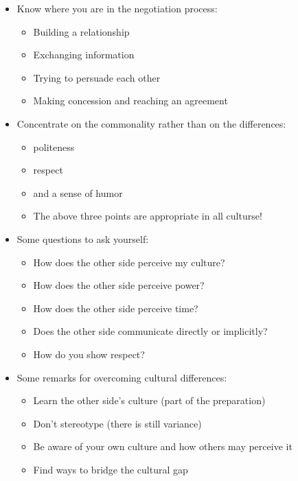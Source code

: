 \begin{itemize}
    \item Know where you are in the negotiation process:
        \begin{itemize}
            \item Building a relationship
            \item Exchanging information
            \item Trying to persuade each other
            \item Making concession and reaching an agreement
        \end{itemize}
    \item Concentrate on the commonality rather than on the differences:
        \begin{itemize}
            \item politeness
            \item respect
            \item and a sense of humor
            \item The above three points are appropriate in all culturse!
        \end{itemize}
    \item Some questions to ask yourself:
        \begin{itemize}
            \item How does the other side perceive my culture?
            \item How does the other side perceive power?
            \item How does the other side perceive time?
            \item Does the other side communicate directly or implicitly?
            \item How do you show respect?
        \end{itemize}
    \item Some remarks for overcoming cultural differences:
        \begin{itemize}
            \item Learn the other side's culture (part of the preparation)
            \item Don't stereotype (there is still variance)
            \item Be aware of your own culture and how others may perceive it
            \item Find ways to bridge the cultural gap
        \end{itemize}
\end{itemize}


